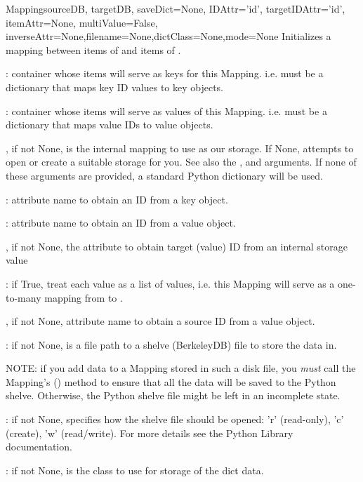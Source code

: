 \documentclass{howto}
\begin{document}
\begin{funcdesc}{Mapping}{sourceDB, targetDB, saveDict=None, IDAttr='id', targetIDAttr='id', itemAttr=None, multiValue=False, inverseAttr=None,filename=None,dictClass=None,mode=None}
  Initializes a mapping between items of  and items of .

  : container whose items will serve as keys for this Mapping.
   i.e.  must be a dictionary that maps key ID values to key objects.

  : container whose items will serve as values of this Mapping.
  i.e.  must be a dictionary that maps value IDs to value objects.

  , if not None, is the internal mapping to use as our storage.
  If None, attempts to open or create a suitable storage for you.
  See also the ,  and  arguments.
  If none of these arguments are provided, a standard Python dictionary will be used.

  : attribute name to obtain an ID from a key object.

  : attribute name to obtain an ID from a value object.

  , if not None, the attribute to obtain target (value) ID
  from an internal storage value

  : if True, treat each value as a list of values, i.e. this
  Mapping will serve as a one-to-many mapping from  to .

  , if not None, attribute name to obtain a source ID from
  a value object.

  : if not None, is a file path to a shelve (BerkeleyDB) file to
  store the data in.

  NOTE: if you add data to a Mapping stored in such a disk file,
  you {\em must} call the Mapping's () method to ensure
  that all the data will be saved to the Python shelve.  Otherwise, the 
  Python shelve file might be left in an incomplete state.

  : if not None, specifies how the shelve file should be opened:
  'r' (read-only), 'c' (create), 'w' (read/write).  For more details see the
  Python Library  documentation.
   
  : if not None, is the class to use for storage of the dict data.
\end{funcdesc}
\end{document}
